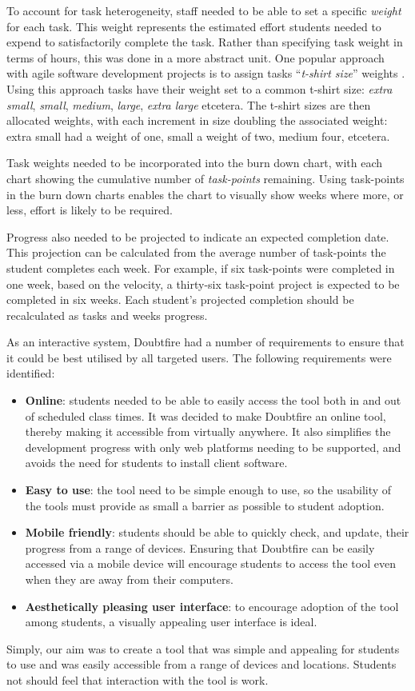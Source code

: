 To account for task heterogeneity, staff needed to be able to set a specific \emph{weight} for each task. This weight represents the estimated effort students needed to expend to satisfactorily complete the task. Rather than specifying task weight in terms of hours, this was done in a more abstract unit. One popular approach with agile software development projects is to assign tasks ``\emph{t-shirt size}'' weights \cite{Peixoto:2010}. Using this approach tasks have their weight set to a common t-shirt size: \emph{extra small}, \emph{small}, \emph{medium}, \emph{large}, \emph{extra large} etcetera. The t-shirt sizes are then allocated weights, with each increment in size doubling the associated weight: extra small had a weight of one, small a weight of two, medium four, etcetera.

Task weights needed to be incorporated into the burn down chart, with each chart showing the cumulative number of \emph{task-points} remaining. Using task-points in the burn down charts enables the chart to visually show weeks where more, or less, effort is likely to be required.

Progress also needed to be projected to indicate an expected completion date. This projection can be calculated from the average number of task-points the student completes each week.  For example, if six task-points were completed in one week, based on the velocity, a thirty-six task-point project is expected to be completed in six weeks. Each student's projected completion should be recalculated as tasks and weeks progress. 

As an interactive system, Doubtfire had a number of requirements to ensure that it could be best utilised by all targeted users. The following requirements were identified:
\begin{itemize}[noitemsep,nolistsep]
  \item \textbf{Online}: students needed to be able to easily access the tool both in and out of scheduled class times. It was decided to make Doubtfire an online tool, thereby making it accessible from virtually anywhere. It also simplifies the development progress with only web platforms needing to be supported, and avoids the need for students to install client software.
  \item \textbf{Easy to use}: the tool need to be simple enough to use, so the usability of the tools must provide as small a barrier as possible to student adoption.
  \item \textbf{Mobile friendly}: students should be able to quickly check, and update, their progress from a range of devices. Ensuring that Doubtfire can be easily accessed via a mobile device will encourage students to access the tool even when they are away from their computers. 
  \item \textbf{Aesthetically pleasing user interface}: to encourage adoption of the tool among students, a visually appealing user interface is ideal.
\end{itemize}
Simply, our aim was to create a tool that was simple and appealing for students to use and was easily accessible from a range of devices and locations. Students not should feel that interaction with the tool is work.

